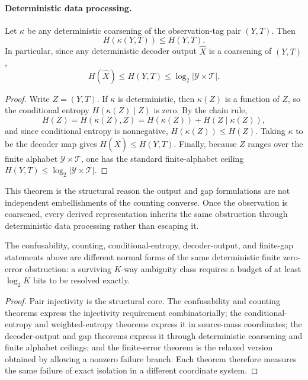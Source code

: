 \paragraph{Deterministic data processing.}
Let $\kappa$ be any deterministic coarsening of the observation-tag pair $(Y,T)$. Then
\[
H(\kappa(Y,T)) \le H(Y,T).
\]
In particular, since any deterministic decoder output $\hat X$ is a coarsening of $(Y,T)$,
\[
H(\hat X)\le H(Y,T)\le \log_2 |\mathcal Y\times \mathcal T|.
\]

\begin{proof}
Write $Z=(Y,T)$. If $\kappa$ is deterministic, then $\kappa(Z)$ is a function of $Z$, so the conditional entropy $H(\kappa(Z)\mid Z)$ is zero. By the chain rule,
\[
H(Z)=H(\kappa(Z),Z)=H(\kappa(Z))+H(Z\mid \kappa(Z)),
\]
and since conditional entropy is nonnegative, $H(\kappa(Z))\le H(Z)$. Taking $\kappa$ to be the decoder map gives $H(\hat X)\le H(Y,T)$. Finally, because $Z$ ranges over the finite alphabet $\mathcal Y\times\mathcal T$, one has the standard finite-alphabet ceiling $H(Y,T)\le \log_2 |\mathcal Y\times\mathcal T|$.
\end{proof}

This theorem is the structural reason the output and gap formulations are not independent embellishments of the counting converse. Once the observation is coarsened, every derived representation inherits the same obstruction through deterministic data processing rather than escaping it.

\begin{proposition}\label{thm:equivalence-viewpoint}
The confusability, counting, conditional-entropy, decoder-output, and finite-gap statements above are different normal forms of the same deterministic finite zero-error obstruction: a surviving $K$-way ambiguity class requires a budget of at least $\log_2 K$ bits to be resolved exactly.
\end{proposition}

\begin{proof}
Pair injectivity is the structural core. The confusability and counting theorems express the injectivity requirement combinatorially; the conditional-entropy and weighted-entropy theorems express it in source-mass coordinates; the decoder-output and gap theorems express it through deterministic coarsening and finite alphabet ceilings; and the finite-error theorem is the relaxed version obtained by allowing a nonzero failure branch. Each theorem therefore measures the same failure of exact isolation in a different coordinate system.
\end{proof}

